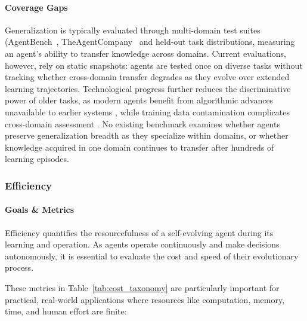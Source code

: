 \paragraph{Coverage Gaps} Generalization is typically evaluated through multi-domain test suites (AgentBench~\citep{liu2023agentbench}, TheAgentCompany~\citep{xu2024theagentcompany} and held-out task distributions, measuring an agent’s ability to transfer knowledge across domains. Current evaluations, however, rely on static snapshots: agents are tested once on diverse tasks without tracking whether cross-domain transfer degrades as they evolve over extended learning trajectories. Technological progress further reduces the discriminative power of older tasks, as modern agents benefit from algorithmic advances unavailable to earlier systems \citep{chan2024mle}, while training data contamination complicates cross-domain assessment \citep{chan2024mle}. No existing benchmark examines whether agents preserve generalization breadth as they specialize within domains, or whether knowledge acquired in one domain continues to transfer after hundreds of learning episodes.


\subsubsection{Efficiency}


\paragraph{Goals \& Metrics} 
Efficiency quantifies the resourcefulness of a self-evolving agent during its learning and operation. As agents operate continuously and make decisions autonomously, it is essential to evaluate the cost and speed of their evolutionary process.

These metrics in Table~\ref{tab:cost_taxonomy} are particularly important for practical, real-world applications where resources like computation, memory, time, and human effort are finite:

